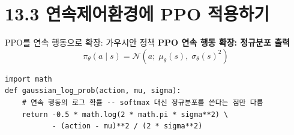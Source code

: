 \section{13.3 연속제어환경에 PPO 적용하기}
\begin{frame}[fragile]{PPO를 연속 행동으로 확장: 가우시안 정책}
  \textbf{PPO 연속 행동 확장: 정규분포 출력}
  \[
    \pi_\theta(a \mid s) = \mathcal{N}(a;\; \mu_\theta(s),\; \sigma_\theta(s)^2)
  \]
\begin{lstlisting}
import math
def gaussian_log_prob(action, mu, sigma):
    # 연속 행동의 로그 확률 -- softmax 대신 정규분포를 쓴다는 점만 다름
    return -0.5 * math.log(2 * math.pi * sigma**2) \
           - (action - mu)**2 / (2 * sigma**2)
\end{lstlisting}
  

\end{frame}
